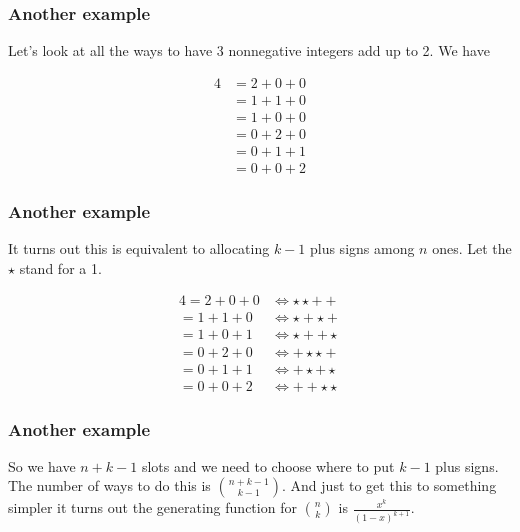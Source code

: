 \documentclass{beamer}
\begin{document}
\begin{frame}
    \frametitle{Another example}

    Let's look at all the ways to have 3 nonnegative integers add up to 2. We have 

    \begin{align*}
        4 &= 2 + 0 + 0 \\
        &= 1 + 1 + 0 \\
        &= 1 + 0 + 0 \\
        &= 0 + 2 + 0 \\
        &= 0 + 1 + 1 \\
        &= 0 + 0 + 2
    \end{align*}

\end{frame}

\begin{frame}
    \frametitle{Another example}

    It turns out this is equivalent to allocating $k-1$ plus signs among $n$ ones. Let the $\star$ stand for a 1.

    \begin{align*}
        4 = 2 + 0 + 0 &\Leftrightarrow \star \star + +\\
        = 1 + 1 + 0 &\Leftrightarrow \star + \star +\\
        = 1 + 0 + 1 &\Leftrightarrow \star + + \star\\
        = 0 + 2 + 0 &\Leftrightarrow + \star \star + \\
        = 0 + 1 + 1 &\Leftrightarrow + \star + \star \\
        = 0 + 0 + 2 &\Leftrightarrow + + \star \star
    \end{align*}

\end{frame}

\begin{frame}
    \frametitle{Another example}

    So we have $n + k - 1$ slots and we need to choose where to put $k-1$ plus signs. The number of ways to do this is ${n + k - 1 \choose k - 1}$. \pause
    \quad
    \newline
    \newline
    And just to get this to something simpler it turns out the generating function for ${n \choose k}$ is $\frac{x ^ k}{(1 - x)^{k + 1}}$.

\end{frame}
\end{document}
